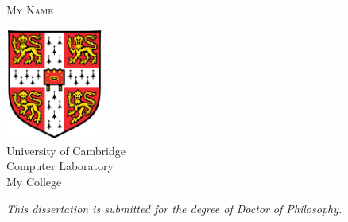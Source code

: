 
{
\pagestyle{empty}

\centering
\null\vfill


\fontsize{36.5}{34}\scshape{}
\\[2cm]%

\fontsize{24}{30}\normalfont
My Name\\[0.5cm]%

\fontsize{20}{30}\normalfont
\monthname\space\number\year

\vfill

\includegraphics[width=3.2cm]{Figures/Shield}\\[0.6cm]

\fontsize{16}{20}\normalfont
University of Cambridge\\
Computer Laboratory\\[10pt]
My College

\vfill

\fontsize{13}{16}\itshape
This dissertation is submitted for the degree of Doctor of Philosophy.

\vfill\null

\restoregeometry
}